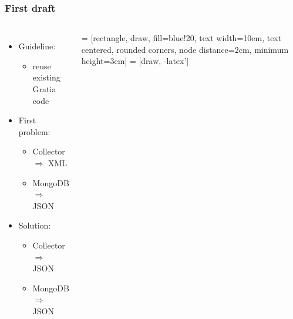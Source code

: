 \documentclass{beamer}
\begin{document}
\begin{frame}[t]
\frametitle{First draft}
\begin{columns}
\begin{itemize}
\item Guideline:
\begin{itemize}
	\item reuse existing Gratia code
\end{itemize}
\item First problem:
\begin{itemize}
	\item Collector $\Longrightarrow$ XML
	\item MongoDB $\Longrightarrow$ JSON
\end{itemize}
\item Solution:
\begin{itemize}
\item Collector $\Longrightarrow$ JSON
\item MongoDB $\Longrightarrow$ JSON
\end{itemize}
\end{itemize}
{ \tiny
{} = [rectangle, draw, fill=blue!20, 
    text width=10em, text centered, rounded corners, node distance=2cm,
    minimum height=3em]
 = [draw, -latex']
}
\end{columns}
\end{frame}
\end{document}

